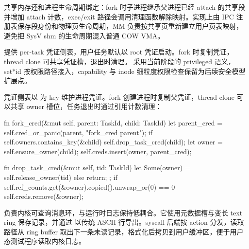 共享内存还和进程生命周期绑定：fork 时子进程继承父进程已经 attach 的共享段并增加 attach 计数，exec/exit 路径会调用清理函数解除映射。实现上由 IPC 注册表保存段身份和物理页生命周期，MM 负责按共享页重新建立用户页表映射，避免把 SysV shm 的生命周期混入普通 COW VMA。

 提供 per-task 凭证侧表，用户任务默认以 root 凭证启动。fork 时复制凭证，thread clone 可共享凭证槽，退出时清理。 采用当前阶段的 privileged 语义，set*id 按权限路径接入，capability 与 inode 细粒度权限检查保留为后续安全模型扩展点。


凭证侧表以  为 key 维护进程凭证。fork 创建进程时复制父凭证，thread clone 可以共享 owner 槽位，任务退出时通过引用计数清理：

\begin{rustcode}
fn fork_cred(&mut self, parent: TaskId, child: TaskId) {
    let parent_cred = self.cred_or_panic(parent, "fork_cred parent");
    if self.owners.contains_key(&child) {
        self.drop_task_cred(child);
    }
    let owner = self.ensure_owner(child);
    self.creds.insert(owner, parent_cred);
}

fn drop_task_cred(&mut self, tid: TaskId) {
    let Some(owner) = self.release_owner(tid) else { return; };
    if self.ref_counts.get(&owner).copied().unwrap_or(0) == 0 {
        self.creds.remove(&owner);
    }
}
\end{rustcode}

 负责内核可查询消息环，与运行时日志保持低耦合。它使用元数据槽与变长 text ring 保存记录，并通过  以传统 ASCII 行导出。syscall 后端按 action 分发，读取路径从 ring buffer 取出下一条未读记录，格式化后拷贝到用户缓冲区，便于用户态测试程序读取内核日志。
